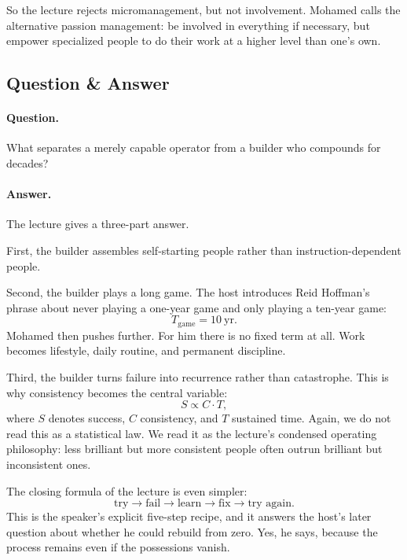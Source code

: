 So the lecture rejects micromanagement, but not involvement. Mohamed calls the alternative passion management: be involved in everything if necessary, but empower specialized people to do their work at a higher level than one's own.

\subsection{Question \& Answer}

\paragraph{Question.} What separates a merely capable operator from a builder who compounds for decades?

\paragraph{Answer.} The lecture gives a three-part answer.

First, the builder assembles self-starting people rather than instruction-dependent people.

Second, the builder plays a long game. The host introduces Reid Hoffman's phrase about never playing a one-year game and only playing a ten-year game:
\begin{equation}
T_{\text{game}} = 10\ \text{yr}.
\end{equation}
Mohamed then pushes further. For him there is no fixed term at all. Work becomes lifestyle, daily routine, and permanent discipline.

Third, the builder turns failure into recurrence rather than catastrophe. This is why consistency becomes the central variable:
\begin{equation}
S \propto C \cdot T,
\end{equation}
where \(S\) denotes success, \(C\) consistency, and \(T\) sustained time. Again, we do not read this as a statistical law. We read it as the lecture's condensed operating philosophy: less brilliant but more consistent people often outrun brilliant but inconsistent ones.

The closing formula of the lecture is even simpler:
\begin{equation}
\text{try} \to \text{fail} \to \text{learn} \to \text{fix} \to \text{try again}.
\end{equation}
This is the speaker's explicit five-step recipe, and it answers the host's later question about whether he could rebuild from zero. Yes, he says, because the process remains even if the possessions vanish.

